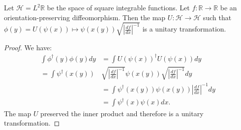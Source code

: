 \documentclass[10pt,twocolumn, nofootinbib]{revtex4-2}
\begin{document}
\begin{prop}
	Let $\mathcal{H} = L^2{\mathbb{R}}$ be the space of square integrable functions. Let $f : \mathbb{R} \to \mathbb{R}$ be an orientation-preserving diffeomorphism. Then the map $U : \mathcal{H} \to \mathcal{H}$ such that 
	$\phi(y) = U(\psi(x)) \mapsto \psi(x(y)) \sqrt{\left|\frac{df}{dx}\right|^{-1}}$ is a unitary transformation.
\end{prop}
\begin{proof}
	We have:
	\begin{equation}
		\begin{aligned}
			\int \phi^\dagger(y) \phi(y) dy &= \int U(\psi(x))^\dagger U(\psi(x)) dy \\
			 = \int \psi^\dagger(x(y)) &\sqrt{\left|\frac{df}{dx}\right|^{-1}}\psi(x(y)) \sqrt{\left|\frac{df}{dx}\right|^{-1}} dy \\
			 &= \int \psi^\dagger(x(y)) \psi(x(y)) \left|\frac{df}{dx}\right|^{-1} dy \\
			 &= \int \psi^\dagger(x) \psi(x) dx.
		\end{aligned}
	\end{equation}
	The map $U$ preserved the inner product and therefore is a unitary transformation.
\end{proof}
\end{document}
